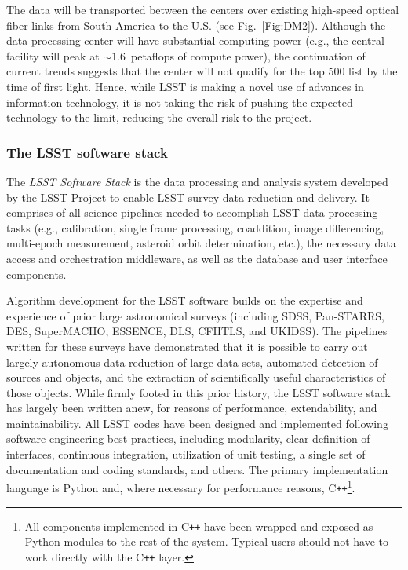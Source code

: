 The data will be transported between the centers over existing high-speed optical fiber
links from South America to the U.S. (see Fig.~\ref{Fig:DM2}).
Although the data processing center will have substantial computing
power (e.g., the central facility will peak at $\sim 1.6$~petaflops of
compute power), the continuation of current trends suggests that the center will
not qualify for the top 500 list by the time of first light.
Hence, while LSST is making a novel use of advances in information technology,
it is not taking the risk of pushing the expected technology to the limit, reducing
the overall risk to the project.

\subsubsection{The LSST software stack}
\label{sec:dmstack}

The {\em LSST Software Stack} is the data processing and analysis
system developed by the LSST Project to enable LSST survey data
reduction and delivery. It comprises of
all science pipelines needed to accomplish LSST data processing tasks
(e.g., calibration, single frame processing, coaddition, image
differencing, multi-epoch measurement, asteroid orbit determination,
etc.), the necessary data
access and orchestration middleware, as well as the database and user
interface components.


Algorithm development for the LSST software builds on the expertise
and experience of prior large astronomical surveys (including SDSS,
Pan-STARRS, DES,
SuperMACHO, ESSENCE,  DLS, CFHTLS, and UKIDSS). The pipelines written
for these surveys have demonstrated that it is possible to carry out
largely autonomous data
reduction of large data sets, automated detection of sources and
objects, and the
extraction of scientifically useful characteristics of those objects.
While firmly footed in this prior history, the LSST software stack has
largely been written anew, for reasons of performance, extendability, and
maintainability. All LSST codes have been designed and implemented
following software engineering best practices, including modularity, clear definition
of interfaces, continuous integration,
utilization of unit testing, a single set of documentation and coding
standards, and others. The primary implementation language is Python and, where
necessary for performance reasons, C\texttt{++}\footnote{All components implemented
in C\texttt{++} have been wrapped and exposed as Python modules to the rest of the system.
Typical users should not have to work directly with the C\texttt{++} layer.}.

